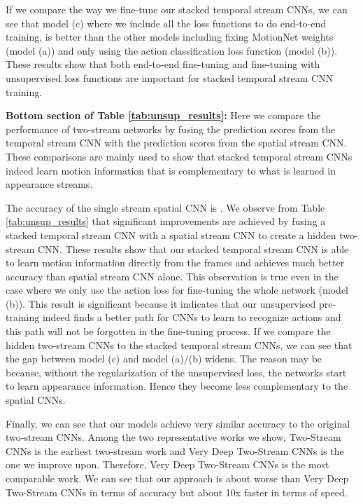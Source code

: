 \documentclass[runningheads]{llncs}
\begin{document}
		If we compare the way we fine-tune our stacked temporal stream CNNs, we can see that model (c) where we include all the loss functions to do end-to-end training, is better than the other models including fixing MotionNet weights (model (a)) and only using the action classification loss function (model (b)). These results show that both end-to-end fine-tuning and fine-tuning with unsupervised loss functions are important for stacked temporal stream CNN training. 
		
		
		\noindent  \textbf{Bottom section of Table \ref{tab:unsup_results}:} Here we compare the performance of two-stream networks by fusing the prediction scores from the temporal stream CNN with the prediction scores from the spatial stream CNN. These comparisons are mainly used to show that stacked temporal stream CNNs indeed learn motion information that is complementary to what is learned in appearance streams. 
		
		The accuracy of the single stream spatial CNN is . We observe from Table \ref{tab:unsup_results} that significant improvements are achieved by fusing a stacked temporal stream CNN with a spatial stream CNN to create a hidden two-stream CNN. These results show that our stacked temporal stream CNN is able to learn motion information directly from the frames and achieves much better accuracy than spatial stream CNN alone. This observation is true even in the case where we only use the action loss for fine-tuning the whole network (model (b)). This result is significant because it indicates that our unsupervised pre-training indeed finds a better path for CNNs to learn to recognize actions and this path will not be forgotten in the fine-tuning process. If we compare the hidden two-stream CNNs to the stacked temporal stream CNNs, we can see that the gap between model (c) and model (a)/(b) widens.  The reason may be because, without the regularization of the unsupervised loss, the networks start to learn appearance information. Hence they become less complementary to the spatial CNNs. 
		
		Finally, we can see that our models achieve very similar accuracy to the original two-stream CNNs. Among the two representative works we show, Two-Stream CNNs \cite{twostream2014} is the earliest two-stream work and Very Deep Two-Stream CNNs \cite{wanggoodpractice2015} is the one we improve upon. Therefore, Very Deep Two-Stream CNNs \cite{wanggoodpractice2015} is the most comparable work. We can see that our approach is about  worse than Very Deep Two-Stream CNNs \cite{wanggoodpractice2015} in terms of accuracy but about 10x faster in terms of speed. 
	
\end{document}
